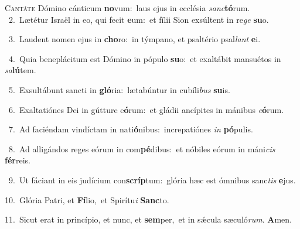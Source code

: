 \lettrine{\initial\textcolor{\initialcolor}{C}}{antáte} Dómino cánticum \textbf{no}\-vum:~\star laus ejus in ecclésia \textit{sanc}\-\textbf{tó}rum.\\
{\numbfont\textcolor{\numbcolor}{~2.}}~Lætétur Israël in eo, qui fecit \textbf{e}\-um:~\star et fílii Sion exsúltent in re\textit{ge} \textbf{su}\-o.\par
{\numbfont\textcolor{\numbcolor}{~3.}}~Laudent nomen ejus in \textbf{cho}\-ro:~\star in týmpano, et psaltério psal\textit{lant} \textbf{e}\-i.\par
{\numbfont\textcolor{\numbcolor}{~4.}}~Quia beneplácitum est Dómino in pópulo \textbf{su}\-o:~\star et exaltábit mansuétos in \textit{sa}\-\textbf{lú}tem.\par
{\numbfont\textcolor{\numbcolor}{~5.}}~Exsultábunt sancti in \textbf{gló}\-ria:~\star lætabúntur in cubíli\textit{bus} \textbf{su}\-is.\par
{\numbfont\textcolor{\numbcolor}{~6.}}~Exaltatiónes Dei in gútture e\-\textbf{ó}\-rum:~\star et gládii ancípites in mánibus \textit{e}\-\textbf{ó}rum.\par
{\numbfont\textcolor{\numbcolor}{~7.}}~Ad faciéndam vindíctam in nati\-\textbf{ó}\-nibus:~\star increpatiónes \textit{in} \textbf{pó}\-pulis.\par
{\numbfont\textcolor{\numbcolor}{~8.}}~Ad alligándos reges eórum in com\-\textbf{pé}\-dibus:~\star et nóbiles eórum in máni\textit{cis} \textbf{fér}\-reis.\par
{\numbfont\textcolor{\numbcolor}{~9.}}~Ut fáciant in eis judícium con\-\textbf{scríp}\-tum:~\star glória hæc est ómnibus sanc\textit{tis} \textbf{e}\-jus.\par
{\numbfont\textcolor{\numbcolor}{10.}}~Glória Patri, et \textbf{Fí}\-lio,~\star et Spirítu\textit{i} \textbf{Sanc}\-to.\par
{\numbfont\textcolor{\numbcolor}{11.}}~Sicut erat in princípio, et nunc, et \textbf{sem}\-per,~\star et in sǽcula sæculó\-\textit{rum}\-. \textbf{A}\-men.\par
